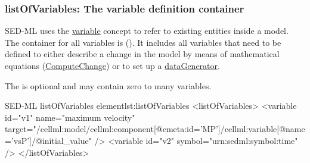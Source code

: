   \subsubsection{listOfVariables: The variable definition container}
\label{sec:listOfVariables}

SED-ML uses the \hyperref[class:variable]{variable} concept to refer to existing entities inside a model. The container for all variables is   (). It includes all variables that need to be defined to either describe a change in the model by means of mathematical equations (\hyperref[class:computeChange]{ComputeChange}) or to set up a \hyperref[class:dataGenerator]{dataGenerator}.

%

 The  is optional and may contain zero to many variables. 
%
\begin{myXmlLst}{SED-ML listOfVariables element}{lst:listOfVariables}
<listOfVariables>
 <variable id="v1" name="maximum velocity" target="/cellml:model/cellml:component[@cmeta:id='MP']/cellml:variable[@name='vsP']/@initial_value" />
 <variable id="v2" symbol="urn:sedml:symbol:time" />
</listOfVariables>
\end{myXmlLst}
%
